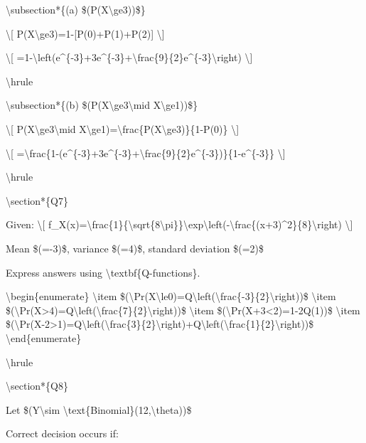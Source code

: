 \textbackslash subsection*\{(a) \$(P(X\textbackslash ge3))\$\}

\textbackslash{[} P(X\textbackslash ge3)=1-{[}P(0)+P(1)+P(2){]}
\textbackslash{]}

\textbackslash{[}
=1-\textbackslash left(e\^{}\{-3\}+3e\^{}\{-3\}+\textbackslash frac\{9\}\{2\}e\^{}\{-3\}\textbackslash right)
\textbackslash{]}

\textbackslash hrule

\textbackslash subsection*\{(b)
\$(P(X\textbackslash ge3\textbackslash mid X\textbackslash ge1))\$\}

\textbackslash{[} P(X\textbackslash ge3\textbackslash mid
X\textbackslash ge1)=\textbackslash frac\{P(X\textbackslash ge3)\}\{1-P(0)\}
\textbackslash{]}

\textbackslash{[}
=\textbackslash frac\{1-(e\^{}\{-3\}+3e\^{}\{-3\}+\textbackslash frac\{9\}\{2\}e\^{}\{-3\})\}\{1-e\^{}\{-3\}\}
\textbackslash{]}

\textbackslash hrule

\textbackslash section*\{Q7\}

Given: \textbackslash{[}
f\_X(x)=\textbackslash frac\{1\}\{\textbackslash sqrt\{8\textbackslash pi\}\}\textbackslash exp\textbackslash left(-\textbackslash frac\{(x+3)\^{}2\}\{8\}\textbackslash right)
\textbackslash{]}

Mean \$(=-3)\$, variance \$(=4)\$, standard deviation \$(=2)\$

Express answers using \textbackslash textbf\{Q-functions\}.

\textbackslash begin\{enumerate\} \textbackslash item
\$(\textbackslash Pr(X\textbackslash le0)=Q\textbackslash left(\textbackslash frac\{-3\}\{2\}\textbackslash right))\$
\textbackslash item
\$(\textbackslash Pr(X\textgreater4)=Q\textbackslash left(\textbackslash frac\{7\}\{2\}\textbackslash right))\$
\textbackslash item
\$(\textbackslash Pr(\textbar X+3\textbar\textless2)=1-2Q(1))\$
\textbackslash item
\$(\textbackslash Pr(\textbar X-2\textbar\textgreater1)=Q\textbackslash left(\textbackslash frac\{3\}\{2\}\textbackslash right)+Q\textbackslash left(\textbackslash frac\{1\}\{2\}\textbackslash right))\$
\textbackslash end\{enumerate\}

\textbackslash hrule

\textbackslash section*\{Q8\}

Let \$(Y\textbackslash sim
\textbackslash text\{Binomial\}(12,\textbackslash theta))\$

Correct decision occurs if:

